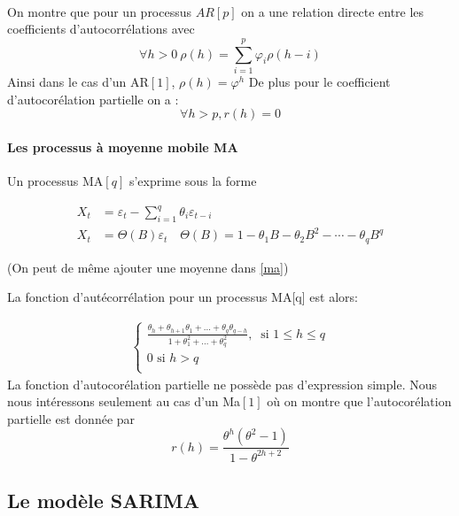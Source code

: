 \documentclass{article}
\theoremstyle{definition}
\theoremstyle{remark}
\begin{document}
\paragraph{}
On montre que pour un processus $AR[p]$ on a une relation directe entre les coefficients d'autocorrélations avec
\[
\forall h > 0 \ \rho(h) = \sum_{i=1}^{p}{\varphi_i \rho(h-i)}	
\]
Ainsi dans le cas d'un AR$[1]$, $\rho(h) = \varphi^h$
De plus pour le coefficient d'autocorélation partielle on a :
\begin{equation}
	\forall h>p, r(h)=0
\end{equation}


\paragraph{Les processus à moyenne mobile MA \\}
Un processus MA$[q]$ s'exprime sous la forme

\begin{equation}
	\label{ma}
\begin{aligned}
	X_{t} &= \varepsilon_{t}-\sum_{i=1}^{q} \theta_{i} \varepsilon_{t-i} \\
	X_{t} &= \Theta(B) \varepsilon_{t} \quad \Theta(B)=1-\theta_{1} B-\theta_{2} B^{2}-\cdots-\theta_{q} B^{q}
\end{aligned}
\end{equation}

(On peut de même ajouter une moyenne dans \ref{ma})

La fonction d'autécorrélation pour un processus MA[q] est alors:

\[
	\begin{aligned}
		\left\{
			\begin{array}{l}
				{\frac{
					\theta_h + \theta_{h+1}\theta_1 + \ldots + \theta_q \theta_{q-h}}
					{1 + \theta_1^2 + \ldots + \theta_q^2}, \ \text{ si } 1 \leqslant h \leqslant q }  \\ 
				{0\text{ si } h > q}  \\ 
			\end{array}
			\right.
\end{aligned}
\]
La fonction d'autocorélation partielle ne possède pas d'expression simple. Nous nous intéressons seulement au cas d'un Ma$[1]$
où on montre que l'autocorélation partielle est donnée par
\[
	r(h) = \frac{\theta^h ( \theta^2 - 1 )}{1 - \theta^{2h+2}}
\] 

\subsection{Le modèle SARIMA}
\end{document}
